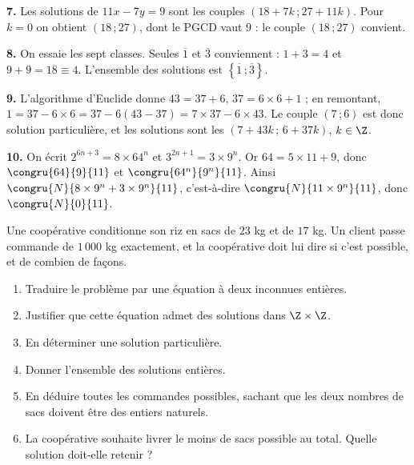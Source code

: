 \begin{corrige}[annales]
\textbf{7.} Les solutions de $11x-7y = 9$ sont les couples
$(18+7k\,;27+11k)$. Pour $k = 0$ on obtient $(18\,;27)$, dont le PGCD vaut
$9$ : le couple $(18\,;27)$ convient.

\textbf{8.} On essaie les sept classes. Seules $\overline1$ et $\overline3$
conviennent : $1+3 = 4$ et $9+9 = 18 \equiv 4$. L'ensemble des solutions est
$\left\{\overline1\,;\overline3\right\}$.

\textbf{9.} L'algorithme d'Euclide donne $43 = 37+6$, $37 = 6\times6+1$ ; en
remontant, $1 = 37-6\times6 = 37-6(43-37) = 7\times37-6\times43$. Le couple
$(7\,;6)$ est donc solution particulière, et les solutions sont les
$(7+43k\,;\,6+37k)$, $k \in \Z$.

\textbf{10.} On écrit $2^{6n+3} = 8\times64^{n}$ et
$3^{2n+1} = 3\times9^{n}$. Or $64 = 5\times11+9$, donc
$\congru{64}{9}{11}$ et $\congru{64^{n}}{9^{n}}{11}$. Ainsi
$\congru{N}{8\times9^{n}+3\times9^{n}}{11}$, c'est-à-dire
$\congru{N}{11\times9^{n}}{11}$, donc $\congru{N}{0}{11}$.
\end{corrige}

\begin{jecherche}
Une coopérative conditionne son riz en sacs de $23$ kg et de $17$ kg. Un
client passe commande de $1\,000$ kg exactement, et la coopérative doit lui
dire si c'est possible, et de combien de façons.

\begin{enumerate}[label=\textbf{\arabic*.}, leftmargin=*, itemsep=0.3em]
  \item Traduire le problème par une équation à deux inconnues entières.
  \item Justifier que cette équation admet des solutions dans $\Z\times\Z$.
  \item En déterminer une solution particulière.
  \item Donner l'ensemble des solutions entières.
  \item En déduire toutes les commandes possibles, sachant que les deux
        nombres de sacs doivent être des entiers naturels.
  \item La coopérative souhaite livrer le moins de sacs possible au total.
        Quelle solution doit-elle retenir ?
\end{enumerate}
\end{jecherche}

